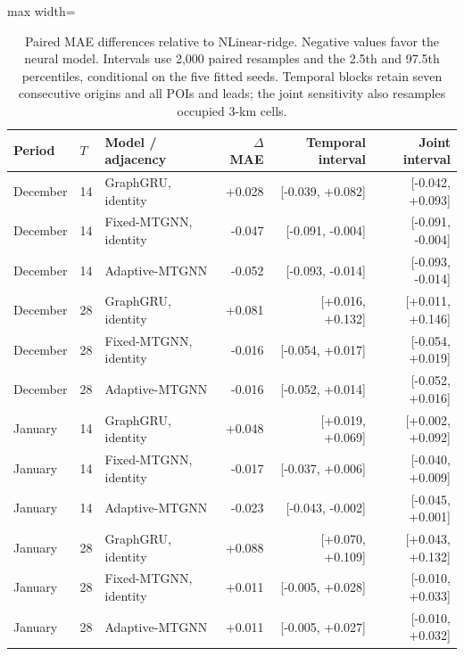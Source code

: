 \begin{table}[!htbp]
\centering
\begingroup
\singlespacing
\fontsize{9pt}{10.5pt}\selectfont
\setlength{\tabcolsep}{4pt}
\renewcommand{\arraystretch}{1.08}
\caption{Paired MAE differences relative to NLinear-ridge. Negative values favor the neural model. Intervals use 2,000 paired resamples and the 2.5th and 97.5th percentiles, conditional on the five fitted seeds. Temporal blocks retain seven consecutive origins and all POIs and leads; the joint sensitivity also resamples occupied 3-km cells.}
\label{tab:forecasting_intervals}
\begin{adjustbox}{max width=\linewidth}
\begin{tabular}{lllrrr}
\toprule
Period & $T$ & Model / adjacency & $\Delta$MAE & Temporal interval & Joint interval \\
\midrule
December & 14 & GraphGRU, identity & +0.028 & [-0.039, +0.082] & [-0.042, +0.093] \\
December & 14 & Fixed-MTGNN, identity & -0.047 & [-0.091, -0.004] & [-0.091, -0.004] \\
December & 14 & Adaptive-MTGNN & -0.052 & [-0.093, -0.014] & [-0.093, -0.014] \\
December & 28 & GraphGRU, identity & +0.081 & [+0.016, +0.132] & [+0.011, +0.146] \\
December & 28 & Fixed-MTGNN, identity & -0.016 & [-0.054, +0.017] & [-0.054, +0.019] \\
December & 28 & Adaptive-MTGNN & -0.016 & [-0.052, +0.014] & [-0.052, +0.016] \\
January & 14 & GraphGRU, identity & +0.048 & [+0.019, +0.069] & [+0.002, +0.092] \\
January & 14 & Fixed-MTGNN, identity & -0.017 & [-0.037, +0.006] & [-0.040, +0.009] \\
January & 14 & Adaptive-MTGNN & -0.023 & [-0.043, -0.002] & [-0.045, +0.001] \\
January & 28 & GraphGRU, identity & +0.088 & [+0.070, +0.109] & [+0.043, +0.132] \\
January & 28 & Fixed-MTGNN, identity & +0.011 & [-0.005, +0.028] & [-0.010, +0.033] \\
January & 28 & Adaptive-MTGNN & +0.011 & [-0.005, +0.027] & [-0.010, +0.032] \\
\bottomrule
\end{tabular}
\end{adjustbox}
\endgroup
\end{table}
